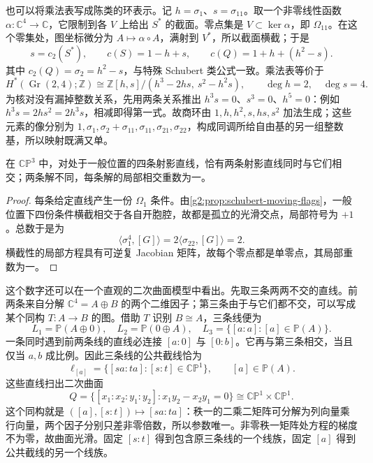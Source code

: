 也可以将乘法表写成陈类的环表示。记 \(h=\sigma_1\)、\(s=\sigma_{11}\)。取一个非零线性函数 \(\alpha:\mathbb C^4\to\mathbb C\)，它限制到各 \(V\) 上给出 \(S^*\) 的截面。零点集是 \(V\subset\ker\alpha\)，即 \(\Omega_{11}\)。在这个零集处，图坐标微分为 \(A\mapsto\alpha\circ A\)，满射到 \(V^*\)，所以截面横截；于是
\[
	s=c_2(S^*),\qquad c(S)=1-h+s,
	\qquad c(Q)=1+h+(h^2-s).
\]
其中 \(c_2(Q)=\sigma_2=h^2-s\)，与特殊 Schubert 类公式一致。乘法表等价于
\begin{equation}\label{g2:eq:gr24-cohomology-ring}
	H^*(\operatorname{Gr}(2,4);\mathbb Z)
	\cong\mathbb Z[h,s]/(h^3-2hs,\ s^2-h^2s),
	\qquad\deg h=2,\quad\deg s=4.
\end{equation}
为核对没有漏掉整数关系，先用两条关系推出 \(h^3s=0\)、\(s^3=0\)、\(h^5=0\)：例如 \(h^3s=2hs^2=2h^3s\)，相减即得第一式。故商环由 \(1,h,h^2,s,hs,s^2\) 加法生成；这些元素的像分别为 \(1,\sigma_1,\sigma_2+\sigma_{11},\sigma_{11},\sigma_{21},\sigma_{22}\)，构成同调所给自由基的另一组整数基，所以映射既满又单。

\begin{theorem}\label{g2:thm:four-lines-two-transversals}
	在 \(\mathbb{CP}^3\) 中，对处于一般位置的四条射影直线，恰有两条射影直线同时与它们相交；两条解不同，每条解的局部相交重数为一。
\end{theorem}
\begin{proof}
	每条给定直线产生一份 \(\Omega_1\) 条件。由\cref{g2:prop:schubert-moving-flags}，一般位置下四份条件横截相交于各自开胞腔，故都是孤立的光滑交点，局部符号为 \(+1\)。总数于是为
	\[
		\langle\sigma_1^4,[G]\rangle
		=2\langle\sigma_{22},[G]\rangle=2.
	\]
	横截性的局部方程具有可逆复 Jacobian 矩阵，故每个零点都是单零点，其局部重数为一。
\end{proof}

这个数字还可以在一个直观的二次曲面模型中看出。先取三条两两不交的直线。前两条来自分解 \(\mathbb C^4=A\oplus B\) 的两个二维因子；第三条由于与它们都不交，可以写成某个同构 \(T:A\to B\) 的图。借助 \(T\) 识别 \(B\cong A\)，三条线便为
\[
	L_1=\mathbb P(A\oplus0),\quad L_2=\mathbb P(0\oplus A),\quad
	L_3=\{[a:a]:[a]\in\mathbb P(A)\}.
\]
一条同时遇到前两条线的直线必连接 \([a:0]\) 与 \([0:b]\)。它再与第三条相交，当且仅当 \(a,b\) 成比例。因此三条线的公共截线恰为
\[
	\ell_{[a]}=\{[sa:ta]:[s:t]\in\mathbb{CP}^1\},\qquad[a]\in\mathbb P(A).
\]
这些直线扫出二次曲面
\begin{equation}\label{g2:eq:three-lines-ruled-quadric}
	Q=\{[x_1:x_2:y_1:y_2]:x_1y_2-x_2y_1=0\}
	\cong\mathbb{CP}^1\times\mathbb{CP}^1.
\end{equation}
这个同构就是 \(([a],[s:t])\mapsto[sa:ta]\)：秩一的二乘二矩阵可分解为列向量乘行向量，两个因子分别只差非零倍数，所以参数唯一。非零秩一矩阵处方程的梯度不为零，故曲面光滑。固定 \([s:t]\) 得到包含原三条线的一个线族，固定 \([a]\) 得到公共截线的另一个线族。

